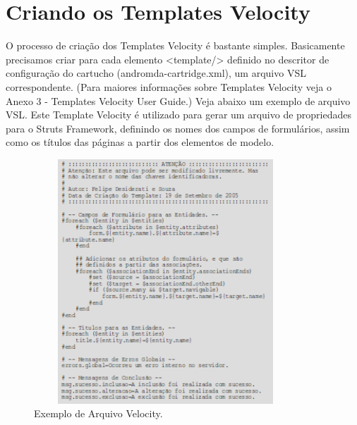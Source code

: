 \section{Criando os Templates Velocity}
O processo de criação dos Templates Velocity é bastante simples. Basicamente
precisamos criar para cada elemento <template/> definido no descritor de
configuração do cartucho (andromda-cartridge.xml), um arquivo VSL
correspondente. (Para maiores informações sobre Templates Velocity veja o Anexo
3 - Templates Velocity User Guide.) Veja abaixo um exemplo de arquivo VSL. Este
Template Velocity é utilizado para gerar um arquivo de propriedades para o
Struts Framework, definindo os nomes dos campos de formulários, assim como os
títulos das páginas a partir dos elementos de modelo.

\begin{figure}[H]
	\centering
	\includegraphics[width=280pt,height=260pt]{files/imgs/apendice-cartucho-novo-00005.png}
	\caption{Exemplo de Arquivo Velocity.}
	\label{exemplo_velocity}
\end{figure}